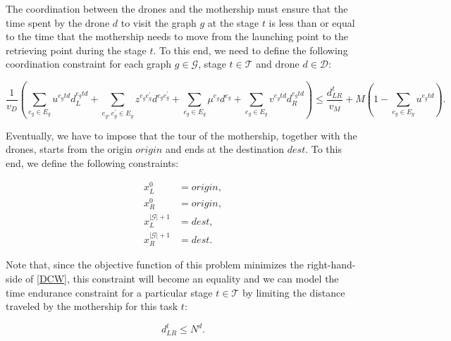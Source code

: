 \noindent
The coordination between the drones and the mothership must ensure that the time spent by the drone $d$ to visit the graph $g$ at the stage $t$ is less than or equal to the time that the mothership needs to move from the launching point to the retrieving point during the stage $t$. To this end, we need to define the following coordination constraint for each graph $g\in \mathcal G$, stage $t\in \mathcal T$ and drone $d\in\mathcal D$:

\begin{equation}\tag{DCW}\label{DCW}
\frac{1}{v_D}\left(\sum_{e_g\in E_g} u^{e_gtd}d_L^{e_gtd} + \sum_{e_g, e^\prime_g\in E_g}z^{e_ge^\prime_g}d^{e_ge^\prime_g} + \sum_{e_g\in E_g} \mu^{e_g}d^{e_g} + \sum_{e_g\in E_g} v^{e_gtd}d_R^{e_gtd}\right) \leq \frac{d_{LR}^t}{v_M} + M(1 - \sum_{e_g\in E_g} u^{e_gtd}).
\end{equation}


\noindent
Eventually, we have to impose that the tour of the mothership, together with the drones, starts from the origin $origin$ and ends at the destination $dest$. To this end, we define the following constraints:

\begin{align*}
x_L^0 & =  origin,  \tag{origin$_1$} \label{eq:O1} \\
x_R^0 & =  origin,  \tag{origin$_2$} \label{eq:O2} \\
x_L^{|\mathcal{G}|+1} & =  dest,  \tag{DEST$_1$} \label{eq:D1} \\
x_R^{|\mathcal{G}|+1} & =  dest.  \tag{DEST$_2$} \label{eq:D2} 
\end{align*}

\noindent
Note that, since the objective function of this problem minimizes the right-hand-side of \eqref{DCW}, this constraint will become an equality and we can model the time endurance constraint for a particular stage $t\in \mathcal T$ by limiting the distance traveled by the mothership for this task $t$:

\begin{equation}\tag{endurance}\label{CAP}
    d_{LR}^t \leq N^d.
\end{equation}







